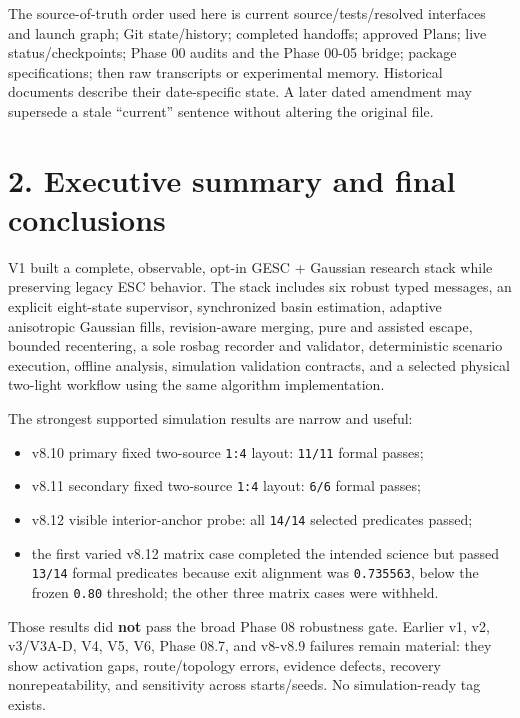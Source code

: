 \documentclass[
  10pt,
  letterpaper,
]{article}
\providecommand{\tightlist}{%
  \setlength{\itemsep}{0pt}\setlength{\parskip}{0pt}}
\begin{document}
The source-of-truth order used here is current source/tests/resolved interfaces
and launch graph; Git state/history; completed handoffs; approved Plans; live
status/checkpoints; Phase 00 audits and the Phase 00-05 bridge; package
specifications; then raw transcripts or experimental memory. Historical
documents describe their date-specific state. A later dated amendment may
supersede a stale ``current'' sentence without altering the original file.

\section{2. Executive summary and final conclusions}\label{executive-summary-and-final-conclusions}

V1 built a complete, observable, opt-in GESC + Gaussian research stack while
preserving legacy ESC behavior. The stack includes six robust typed messages,
an explicit eight-state supervisor, synchronized basin estimation, adaptive
anisotropic Gaussian fills, revision-aware merging, pure and assisted escape,
bounded recentering, a sole rosbag recorder and validator, deterministic
scenario execution, offline analysis, simulation validation contracts, and a
selected physical two-light workflow using the same algorithm implementation.

The strongest supported simulation results are narrow and useful:

\begin{itemize}
\tightlist
\item
  v8.10 primary fixed two-source \nolinkurl{1:4} layout: \nolinkurl{11/11} formal passes;
\item
  v8.11 secondary fixed two-source \nolinkurl{1:4} layout: \nolinkurl{6/6} formal passes;
\item
  v8.12 visible interior-anchor probe: all \nolinkurl{14/14} selected predicates passed;
\item
  the first varied v8.12 matrix case completed the intended science but passed
  \nolinkurl{13/14} formal predicates because exit alignment was \nolinkurl{0.735563}, below the
  frozen \nolinkurl{0.80} threshold; the other three matrix cases were withheld.
\end{itemize}

Those results did \textbf{not} pass the broad Phase 08 robustness gate. Earlier v1,
v2, v3/V3A-D, V4, V5, V6, Phase 08.7, and v8-v8.9 failures remain material:
they show activation gaps, route/topology errors, evidence defects, recovery
nonrepeatability, and sensitivity across starts/seeds. No simulation-ready tag
exists.
\end{document}
